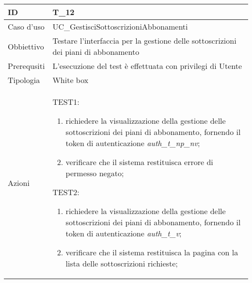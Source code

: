 \begin{table}[hb]
    \centering
    \begin{tabular}{ |p{2cm}|p{10cm}|  }
        \hline
        ID          & T\_12                                                                               \\\hline
        Caso d'uso  & UC\_GestisciSottoscrizioniAbbonamenti                                               \\\hline
        Obbiettivo  & Testare l'interfaccia per la gestione delle sottoscrizioni dei piani di abbonamento \\\hline
        Prerequsiti & L'esecuzione del test è effettuata con privilegi di Utente                          \\\hline
        Tipologia   & White box                                                                           \\\hline
        Azioni      &
        TEST1:
        \begin{enumerate}[nosep, topsep=0pt]
            \item richiedere la visualizzazione della gestione delle sottoscrizioni dei piani di abbonamento, fornendo il token di autenticazione \emph{auth\_t\_np\_nv};
            \item verificare che il sistema restituisca errore di permesso negato;
        \end{enumerate}
        \vspace{0.5cm} TEST2:
        \begin{enumerate}[nosep, topsep=0pt]
            \item richiedere la visualizzazione della gestione delle sottoscrizioni dei piani di abbonamento, fornendo il token di autenticazione \emph{auth\_t\_v};
            \item verificare che il sistema restituisca la pagina con la lista delle sottoscrizioni richieste;
        \end{enumerate}
        \\\hline
    \end{tabular}
\end{table}

